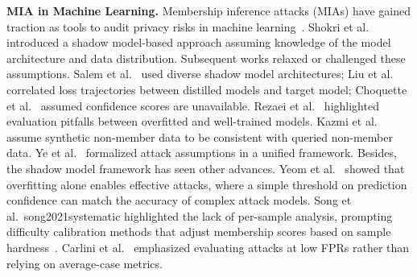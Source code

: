 \textbf{MIA in Machine Learning.} Membership inference attacks (MIAs) have gained traction as tools to audit privacy risks in machine learning~\cite{song2021systematic, song2019privacy, huang2024general, yeom2018privacy, leino2020stolen, long2018understanding, nasr2019comprehensive, sablayrolles2019white, salem2018ml, truex2019demystifying}. Shokri et al.~\cite{shokri2017membership} introduced a shadow model-based approach assuming knowledge of the model architecture and data distribution. Subsequent works relaxed or challenged these assumptions. Salem et al.~\cite{salem2018ml} used diverse shadow model architectures; Liu et al.~\cite{liu2022membership} correlated loss trajectories between distilled models and target model; Choquette et al.~\cite{choquette2021label} assumed confidence scores are unavailable. Rezaei et al.~\cite{rezaei2021difficulty} highlighted evaluation pitfalls between overfitted and well-trained models. Kazmi et al.~\cite{kazmi2024panoramia} assume synthetic non-member data to be consistent with queried non-member data. Ye et al.~\cite{ye2022enhanced} formalized attack assumptions in a unified framework. Besides, the shadow model framework has seen other advances. Yeom et al.~\cite{yeom2018privacy} showed that overfitting alone enables effective attacks, where a simple threshold on prediction confidence can match the accuracy of complex attack models. Song et al.~{song2021systematic} highlighted the lack of per-sample analysis, prompting difficulty calibration methods that adjust membership scores based on sample hardness~\cite{watson2021importance, he2024difficulty}. Carlini et al.~\cite{carlini2022membership} emphasized evaluating attacks at low FPRs rather than relying on average-case metrics.





